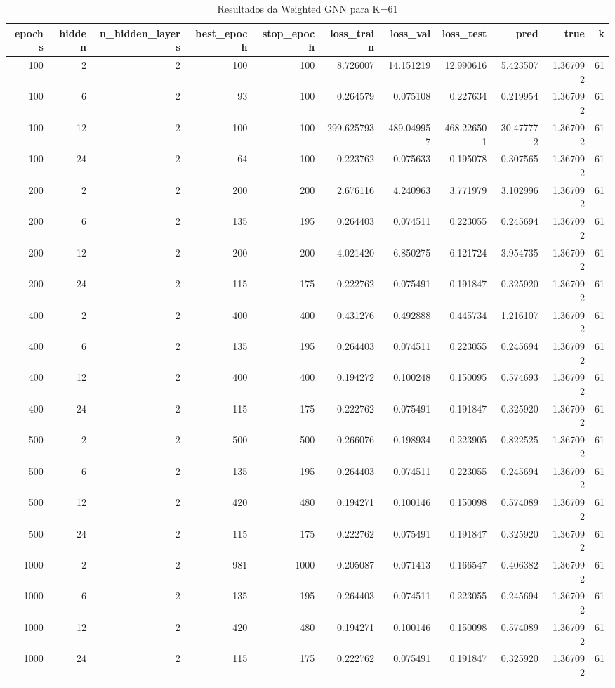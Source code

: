 \begin{table}
\caption{Resultados da Weighted GNN para K=61}
\label{tab:weighted_gnn_results_k61}
\begin{tabular}{rrrrrrrrrrr}
\toprule
epochs & hidden & n\_hidden\_layers & best\_epoch & stop\_epoch & loss\_train & loss\_val & loss\_test & pred & true & k \\
\midrule
100 & 2 & 2 & 100 & 100 & 8.726007 & 14.151219 & 12.990616 & 5.423507 & 1.367092 & 61 \\
100 & 6 & 2 & 93 & 100 & 0.264579 & 0.075108 & 0.227634 & 0.219954 & 1.367092 & 61 \\
100 & 12 & 2 & 100 & 100 & 299.625793 & 489.049957 & 468.226501 & 30.477772 & 1.367092 & 61 \\
100 & 24 & 2 & 64 & 100 & 0.223762 & 0.075633 & 0.195078 & 0.307565 & 1.367092 & 61 \\
200 & 2 & 2 & 200 & 200 & 2.676116 & 4.240963 & 3.771979 & 3.102996 & 1.367092 & 61 \\
200 & 6 & 2 & 135 & 195 & 0.264403 & 0.074511 & 0.223055 & 0.245694 & 1.367092 & 61 \\
200 & 12 & 2 & 200 & 200 & 4.021420 & 6.850275 & 6.121724 & 3.954735 & 1.367092 & 61 \\
200 & 24 & 2 & 115 & 175 & 0.222762 & 0.075491 & 0.191847 & 0.325920 & 1.367092 & 61 \\
400 & 2 & 2 & 400 & 400 & 0.431276 & 0.492888 & 0.445734 & 1.216107 & 1.367092 & 61 \\
400 & 6 & 2 & 135 & 195 & 0.264403 & 0.074511 & 0.223055 & 0.245694 & 1.367092 & 61 \\
400 & 12 & 2 & 400 & 400 & 0.194272 & 0.100248 & 0.150095 & 0.574693 & 1.367092 & 61 \\
400 & 24 & 2 & 115 & 175 & 0.222762 & 0.075491 & 0.191847 & 0.325920 & 1.367092 & 61 \\
500 & 2 & 2 & 500 & 500 & 0.266076 & 0.198934 & 0.223905 & 0.822525 & 1.367092 & 61 \\
500 & 6 & 2 & 135 & 195 & 0.264403 & 0.074511 & 0.223055 & 0.245694 & 1.367092 & 61 \\
500 & 12 & 2 & 420 & 480 & 0.194271 & 0.100146 & 0.150098 & 0.574089 & 1.367092 & 61 \\
500 & 24 & 2 & 115 & 175 & 0.222762 & 0.075491 & 0.191847 & 0.325920 & 1.367092 & 61 \\
1000 & 2 & 2 & 981 & 1000 & 0.205087 & 0.071413 & 0.166547 & 0.406382 & 1.367092 & 61 \\
1000 & 6 & 2 & 135 & 195 & 0.264403 & 0.074511 & 0.223055 & 0.245694 & 1.367092 & 61 \\
1000 & 12 & 2 & 420 & 480 & 0.194271 & 0.100146 & 0.150098 & 0.574089 & 1.367092 & 61 \\
1000 & 24 & 2 & 115 & 175 & 0.222762 & 0.075491 & 0.191847 & 0.325920 & 1.367092 & 61 \\
\bottomrule
\end{tabular}
\end{table}
